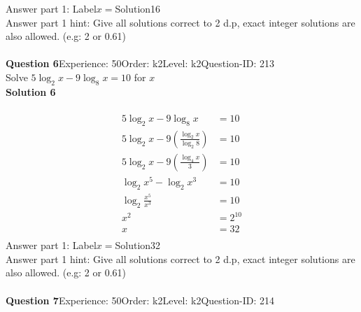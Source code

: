 \documentclass{article}
\begin{document}
Answer part 1: \hspace{10pt}Label\hspace{10pt}$x=$\hspace{10pt}Solution\hspace{10pt}16\\
Answer part 1 hint: \hspace{15pt}Give all solutions correct to 2 d.p, exact integer solutions are also allowed. (e.g: 2 or 0.61)\\
\\[4pt]
\noindent\textbf{Question 6}\hspace{20pt}Experience: 50\hspace{20pt}Order: k2\hspace{20pt}Level: k2\hspace{20pt}Question-ID: 213\\[2pt]
Solve $5\log_{2}x-9\log_{8}x=10$ for $x$\\[4pt]
\noindent\textbf{Solution 6}\\[2pt]
\\[-35pt]\begin{align*}
5\log_{2}x-9\log_{8}x&=10\\[2pt]
5\log_{2}x-9\left(\displaystyle\frac{\log_{2}x}{\log_{2}8}\right)&=10\\[2pt]
5\log_{2}x-9\left(\displaystyle\frac{\log_{4}x}{3}\right)&=10\\[2pt]
\log_{2}x^5-\log_{2}x^3&=10\\[2pt]
\log_{2}\displaystyle\frac{x^5}{x^3}&=10\\[2pt]
x^2&=2^{10}\\[2pt]
x&=32\\[2pt]
\end{align*}
Answer part 1: \hspace{10pt}Label\hspace{10pt}$x=$\hspace{10pt}Solution\hspace{10pt}32\\
Answer part 1 hint: \hspace{15pt}Give all solutions correct to 2 d.p, exact integer solutions are also allowed. (e.g: 2 or 0.61)\\
\\[4pt]
\noindent\textbf{Question 7}\hspace{20pt}Experience: 50\hspace{20pt}Order: k2\hspace{20pt}Level: k2\hspace{20pt}Question-ID: 214\\[2pt]
\end{document}
